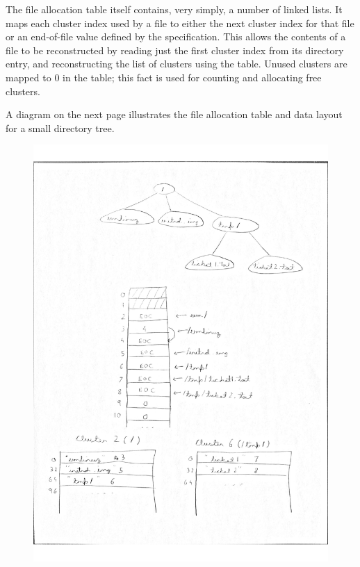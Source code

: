 \documentclass[runningheads,a4paper]{llncs}
\begin{document}
The file allocation table itself contains, very simply, a number of
linked lists. It maps each cluster index used by a file to either the
next cluster index for that file or an end-of-file value defined by the
specification. This allows the contents of a file to be reconstructed
by reading just the first cluster index from its directory entry, and
reconstructing the list of clusters using the table. Unused clusters
are mapped to 0 in the table; this fact is used for counting and
allocating free clusters.

A diagram on the next page illustrates the file allocation table and
data layout for a small directory tree.

\begin{figure}
  \includegraphics[page=1,width=1.10\textwidth]{fat32-diagram.pdf}
\end{figure}
\end{document}
